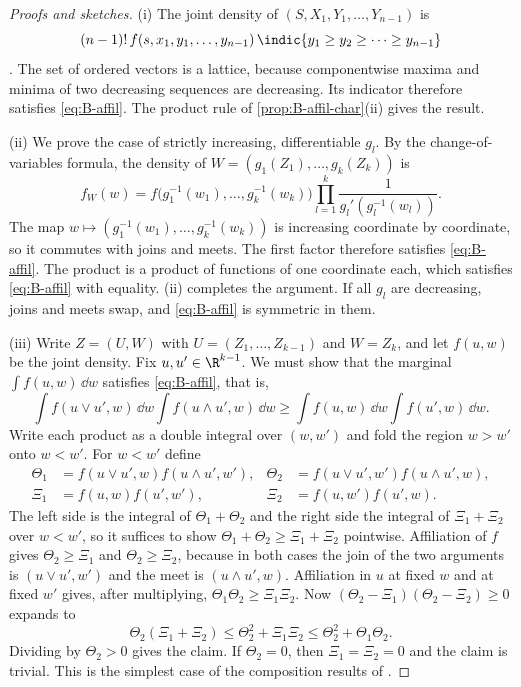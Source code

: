\begin{proof}[Proofs and sketches]
(i) The joint density of $(S, X_1, Y_1, \dots, Y_{n-1})$ is
\[
  (n - 1)!\,f(s, x_1, y_1, \dots, y_{n-1})\,\indic\{y_1 \geq y_2 \geq \dots \geq y_{n-1}\}
\]
\citep[eq.~(4), p.~1099]{MilgromWeber1982}. The set of ordered vectors is a lattice, because componentwise maxima
and minima of two decreasing sequences are decreasing. Its indicator therefore satisfies \eqref{eq:B-affil}. The
product rule of \cref{prop:B-affil-char}(ii) gives the result.

(ii) We prove the case of strictly increasing, differentiable $g_l$. By the change-of-variables formula, the density
of $W = (g_1(Z_1), \dots, g_k(Z_k))$ is
\[
  f_W(w) = f\bigl(g_1^{-1}(w_1), \dots, g_k^{-1}(w_k)\bigr)\prod_{l=1}^k\frac{1}{g_l'(g_l^{-1}(w_l))}.
\]
The map $w \mapsto (g_1^{-1}(w_1), \dots, g_k^{-1}(w_k))$ is increasing coordinate by coordinate, so it commutes with joins and
meets. The first factor therefore satisfies \eqref{eq:B-affil}. The product is a product of functions of one
coordinate each, which satisfies \eqref{eq:B-affil} with equality. (ii) completes the
argument. If all $g_l$ are decreasing, joins and meets swap, and \eqref{eq:B-affil} is symmetric in them.

(iii) Write $Z = (U, W)$ with $U = (Z_1, \dots, Z_{k-1})$ and $W = Z_k$, and let $f(u, w)$ be the joint density. Fix
$u, u' \in \R^{k-1}$. We must show that the marginal $\int f(u, w)\,\dd w$ satisfies \eqref{eq:B-affil}, that is,
\[
  \int f(u \vee u', w)\,\dd w\int f(u \wedge u', w)\,\dd w \geq \int f(u, w)\,\dd w\int f(u', w)\,\dd w.
\]
Write each product as a double integral over $(w, w')$ and fold the region $w > w'$ onto $w < w'$. For $w < w'$ define
\begin{align*}
  \Theta_1 &= f(u \vee u', w)f(u \wedge u', w'), & \Theta_2 &= f(u \vee u', w')f(u \wedge u', w),\\
  \Xi_1 &= f(u, w)f(u', w'), & \Xi_2 &= f(u, w')f(u', w).
\end{align*}
The left side is the integral of $\Theta_1 + \Theta_2$ and the right side the integral of $\Xi_1 + \Xi_2$ over $w < w'$, so it
suffices to show $\Theta_1 + \Theta_2 \geq \Xi_1 + \Xi_2$ pointwise. Affiliation of $f$ gives $\Theta_2 \geq \Xi_1$ and $\Theta_2 \geq \Xi_2$,
because in both cases the join of the two arguments is $(u \vee u', w')$ and the meet is $(u \wedge u', w)$. Affiliation in $u$
at fixed $w$ and at fixed $w'$ gives, after multiplying, $\Theta_1\Theta_2 \geq \Xi_1\Xi_2$. Now
$(\Theta_2 - \Xi_1)(\Theta_2 - \Xi_2) \geq 0$ expands to
\[
  \Theta_2(\Xi_1 + \Xi_2) \leq \Theta_2^2 + \Xi_1\Xi_2 \leq \Theta_2^2 + \Theta_1\Theta_2.
\]
Dividing by $\Theta_2 > 0$ gives the claim. If $\Theta_2 = 0$, then $\Xi_1 = \Xi_2 = 0$ and the claim is trivial. This is the
simplest case of the composition results of \citet{KarlinRinott1980}.


\end{proof}

